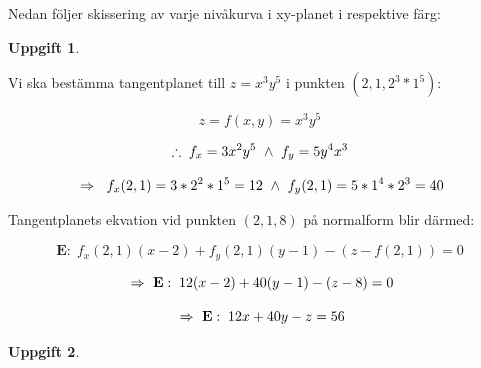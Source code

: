 \documentclass{article}
\newtheorem{thr}{Uppgift}
\begin{document}
\begin{enumerate}
        \vskip 0.3cm

        Nedan följer skissering av varje nivåkurva i xy-planet i respektive färg:

        \newpage

        \begin{figure}[h]
            \center
        \end{figure}
\end{enumerate}

\newpage

\begin{thr}
\end{thr}

Vi ska bestämma tangentplanet till $z=x^3y^5$ i punkten $(2, 1, 2^3*1^5)$:

$$
z=f(x, y)=x^3y^5
$$

$$
\therefore\; f_{x}=3x^2y^5 \ \wedge \  f_{y}=5y^4x^3
$$

$$
\ \Rightarrow \ \;
f_{x}(2, 1)=3*2^2*1^5=12 
\ \wedge \ 
f_{y}(2, 1)=5*1^4*2^3=40
$$

\vskip 0.2cm

Tangentplanets ekvation vid punkten $(2, 1, 8)$ på normalform blir därmed:

\vskip 0.2cm

$$
\mathbf{E}:\; f_{x}(2, 1)(x-2)+f_{y}(2, 1)(y-1)-(z-f(2, 1))=0
$$

$$
\ \Rightarrow \ 
\mathbf{E}:\; 12(x-2)+40(y-1)-(z-8)=0
$$

$$
\ \Rightarrow \ 
\mathbf{E}:\; 12x+40y-z=56
$$

\newpage

\begin{thr}
\end{thr}
\end{document}
